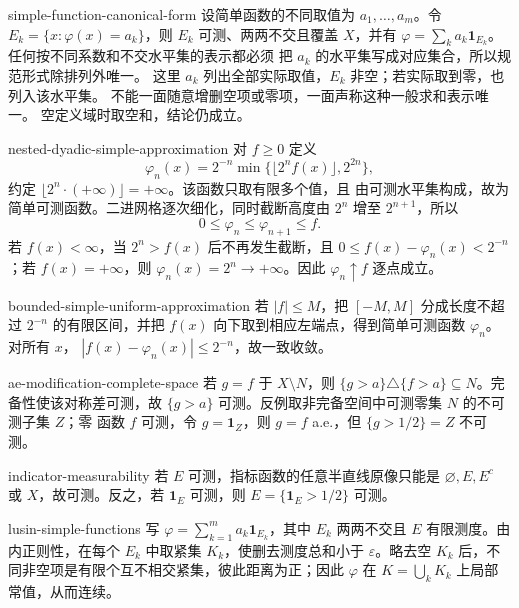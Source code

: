 \begin{solution}{simple-function-canonical-form}
设简单函数的不同取值为 $a_1,\ldots,a_m$。令
$E_k=\{x:\varphi(x)=a_k\}$，则 $E_k$ 可测、两两不交且覆盖 $X$，并有
$\varphi=\sum_ka_k\mathbf1_{E_k}$。任何按不同系数和不交水平集的表示都必须
把 $a_k$ 的水平集写成对应集合，所以规范形式除排列外唯一。
这里 $a_k$ 列出全部实际取值，$E_k$ 非空；若实际取到零，也列入该水平集。
不能一面随意增删空项或零项，一面声称这种一般求和表示唯一。
空定义域时取空和，结论仍成立。
\end{solution}

\begin{solution}{nested-dyadic-simple-approximation}
对 $f\ge0$ 定义
\[
 \varphi_n(x)=2^{-n}
 \min\bigl\{\lfloor2^nf(x)\rfloor,2^{2n}\bigr\},
\]
约定 $\lfloor2^n\cdot(+\infty)\rfloor=+\infty$。该函数只取有限多个值，且
由可测水平集构成，故为简单可测函数。二进网格逐次细化，同时截断高度由
$2^n$ 增至 $2^{n+1}$，所以
\[
 0\le\varphi_n\le\varphi_{n+1}\le f.
\]
若 $f(x)<\infty$，当 $2^n>f(x)$ 后不再发生截断，且
$0\le f(x)-\varphi_n(x)<2^{-n}$；若 $f(x)=+\infty$，则
$\varphi_n(x)=2^n\to+\infty$。因此 $\varphi_n\uparrow f$ 逐点成立。
\end{solution}

\begin{solution}{bounded-simple-uniform-approximation}
若 $|f|\le M$，把 $[-M,M]$ 分成长度不超过 $2^{-n}$ 的有限区间，并把
$f(x)$ 向下取到相应左端点，得到简单可测函数 $\varphi_n$。对所有 $x$，
$|f(x)-\varphi_n(x)|\le2^{-n}$，故一致收敛。
\end{solution}

\begin{solution}{ae-modification-complete-space}
若 $g=f$ 于 $X\setminus N$，则
$\{g>a\}\triangle\{f>a\}\subseteq N$。完备性使该对称差可测，故
$\{g>a\}$ 可测。反例取非完备空间中可测零集 $N$ 的不可测子集 $Z$；零
函数 $f$ 可测，令 $g=\mathbf1_Z$，则 $g=f$ a.e.，但
$\{g>1/2\}=Z$ 不可测。
\end{solution}

\begin{solution}{indicator-measurability}
若 $E$ 可测，指标函数的任意半直线原像只能是
$\varnothing,E,E^c$ 或 $X$，故可测。反之，若 $\mathbf1_E$ 可测，则
$E=\{\mathbf1_E>1/2\}$ 可测。
\end{solution}

\begin{solution}{lusin-simple-functions}
写 $\varphi=\sum_{k=1}^ma_k\mathbf1_{E_k}$，其中 $E_k$ 两两不交且 $E$
有限测度。由内正则性，在每个 $E_k$ 中取紧集 $K_k$，使删去测度总和小于
$\varepsilon$。略去空 $K_k$ 后，不同非空项是有限个互不相交紧集，彼此距离为正；因此
$\varphi$ 在 $K=\bigcup_kK_k$ 上局部常值，从而连续。
\end{solution}


